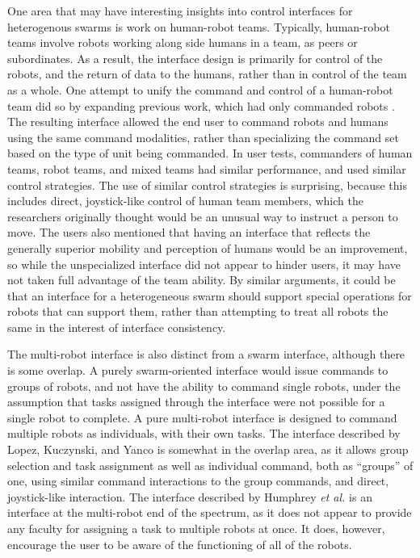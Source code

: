 One area that may have interesting insights into control interfaces for heterogenous swarms is work on human-robot teams. 
Typically, human-robot teams involve robots working along side humans in a team, as peers or subordinates. 
As a result, the interface design is primarily for control of the robots, and the return of data to the humans, rather than in control of the team as a whole.
One attempt to unify the command and control of a human-robot team \citep{lopez2017unified} did so by expanding previous work, which had only commanded robots \citep{Micire:2009:ANG:1731903.1731912}. 
The resulting interface allowed the end user to command robots and humans using the same command modalities, rather than specializing the command set based on the type of unit being commanded. 
In user tests, commanders of human teams, robot teams, and mixed teams had similar performance, and used similar control strategies.
The use of similar control strategies is surprising, because this includes direct, joystick-like control of human team members, which the researchers originally thought would be an unusual way to instruct a person to move. 
The users also mentioned that having an interface that reflects the generally superior mobility and perception of humans would be an improvement, so while the unspecialized interface did not appear to hinder users, it may have not taken full advantage of the team ability. 
By similar arguments, it could be that an interface for a heterogeneous swarm should support special operations for robots that can support them, rather than attempting to treat all robots the same in the interest of interface consistency. 

The multi-robot interface is also distinct from a swarm interface, although there is some overlap. 
A purely swarm-oriented interface would issue commands to groups of robots, and not have the ability to command single robots, under the assumption that tasks assigned through the interface were not possible for a single robot to complete. 
A pure multi-robot interface is designed to command multiple robots as individuals, with their own tasks. 
The interface described by Lopez, Kuczynski, and Yanco is somewhat in the overlap area, as it allows group selection and task assignment as well as individual command, both as ``groups'' of one, using similar command interactions to the group commands, and direct, joystick-like interaction. 
The interface described by Humphrey \emph{et al.} is an interface at the multi-robot end of the spectrum, as it does not appear to provide any faculty for assigning a task to multiple robots at once.
It does, however, encourage the user to be aware of the functioning of all of the robots. 

